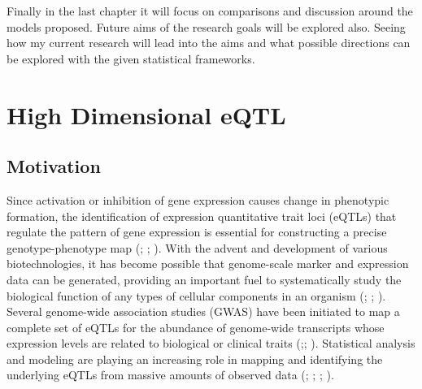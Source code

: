 \documentclass[11pt,]{book}
\theoremstyle{definition}
\theoremstyle{definition}
\theoremstyle{remark}
\begin{document}
Finally in the last chapter it will focus on comparisons and discussion
around the models proposed. Future aims of the research goals will be
explored also. Seeing how my current research will lead into the aims
and what possible directions can be explored with the given statistical
frameworks.

\hypertarget{highdeqtl}{\chapter{High Dimensional
eQTL}\label{highdeqtl}}

\section{Motivation}\label{motivation}

Since activation or inhibition of gene expression causes change in
phenotypic formation, the identification of expression quantitative
trait loci (eQTLs) that regulate the pattern of gene expression is
essential for constructing a precise genotype-phenotype map
(\cite{emilsson2008genetics}; \cite{cookson2009mapping};
\cite{nica2013expression}). With the advent and development of various
biotechnologies, it has become possible that genome-scale marker and
expression data can be generated, providing an important fuel to
systematically study the biological function of any types of cellular
components in an organism (\cite{kim2014meta}; \cite{fairfax2014innate};
\cite{lee2014common}). Several genome-wide association studies (GWAS)
have been initiated to map a complete set of eQTLs for the abundance of
genome-wide transcripts whose expression levels are related to
biological or clinical traits
(\cite{nica2013expression};\cite{li2013using};
\cite{koopmann2014genome}). Statistical analysis and modeling are
playing an increasing role in mapping and identifying the underlying
eQTLs from massive amounts of observed data
(\cite{kendziorski2006statistical}; \cite{chun2009expression};
\cite{sun2012statistical}; \cite{flutre2013statistical}).
\end{document}
